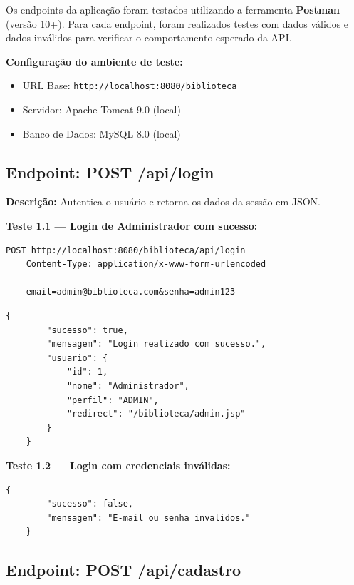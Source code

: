 \label{sec:testes_endpoints}

Os endpoints da aplicação foram testados utilizando a ferramenta \textbf{Postman} (versão 10+). Para cada endpoint, foram realizados testes com dados válidos e dados inválidos para verificar o comportamento esperado da API.

\textbf{Configuração do ambiente de teste:}
\begin{itemize}
	\item URL Base: \texttt{http://localhost:8080/biblioteca}
	\item Servidor: Apache Tomcat 9.0 (local)
	\item Banco de Dados: MySQL 8.0 (local)
\end{itemize}

\subsection{Endpoint: POST /api/login}

\textbf{Descrição:} Autentica o usuário e retorna os dados da sessão em JSON.

\textbf{Teste 1.1 --- Login de Administrador com sucesso:}

\begin{lstlisting}[style=sqlStyle, caption={Requisição: POST /api/login (Administrador)}]
	POST http://localhost:8080/biblioteca/api/login
	Content-Type: application/x-www-form-urlencoded
	
	email=admin@biblioteca.com&senha=admin123
\end{lstlisting}

\begin{lstlisting}[style=sqlStyle, caption={Resposta esperada (HTTP 200 OK)}]
	{
		"sucesso": true,
		"mensagem": "Login realizado com sucesso.",
		"usuario": {
			"id": 1,
			"nome": "Administrador",
			"perfil": "ADMIN",
			"redirect": "/biblioteca/admin.jsp"
		}
	}
\end{lstlisting}

\textbf{Teste 1.2 --- Login com credenciais inválidas:}

\begin{lstlisting}[style=sqlStyle, caption={Resposta esperada (HTTP 401 Unauthorized)}]
	{
		"sucesso": false,
		"mensagem": "E-mail ou senha invalidos."
	}
\end{lstlisting}

\subsection{Endpoint: POST /api/cadastro}

